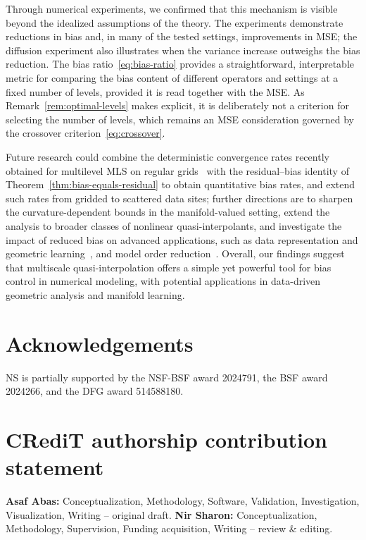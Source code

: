 \documentclass[12pt]{article}
\begin{document}
Through numerical experiments, we confirmed that this mechanism is visible beyond the idealized assumptions of the theory. The experiments demonstrate reductions in bias and, in many of the tested settings, improvements in MSE; the diffusion experiment also illustrates when the variance increase outweighs the bias reduction. The bias ratio~\eqref{eq:bias-ratio} provides a straightforward, interpretable metric for comparing the bias content of different operators and settings at a fixed number of levels, provided it is read together with the MSE. As Remark~\ref{rem:optimal-levels} makes explicit, it is deliberately not a criterion for selecting the number of levels, which remains an MSE consideration governed by the crossover criterion~\eqref{eq:crossover}.

Future research could combine the deterministic convergence rates recently obtained for multilevel MLS on regular grids~\cite{durst2026improved} with the residual--bias identity of Theorem~\ref{thm:bias-equals-residual} to obtain quantitative bias rates, and extend such rates from gridded to scattered data sites; further directions are to sharpen the curvature-dependent bounds in the manifold-valued setting, extend the analysis to broader classes of nonlinear quasi-interpolants, and investigate the impact of reduced bias on advanced applications, such as data representation and geometric learning~\cite{rabin2012heterogeneous}, and model order reduction~\cite{zimmermann2021manifold, farhat2020computational}. Overall, our findings suggest that multiscale quasi-interpolation offers a simple yet powerful tool for bias control in numerical modeling, with potential applications in data-driven geometric analysis and manifold learning.

\section*{Acknowledgements}
NS is partially supported by the NSF-BSF award 2024791, the BSF award 2024266, and the DFG award 514588180.

\section*{CRediT authorship contribution statement}
\textbf{Asaf Abas:} Conceptualization, Methodology, Software, Validation, Investigation, Visualization, Writing -- original draft. \textbf{Nir Sharon:} Conceptualization, Methodology, Supervision, Funding acquisition, Writing -- review \& editing.
\end{document}
